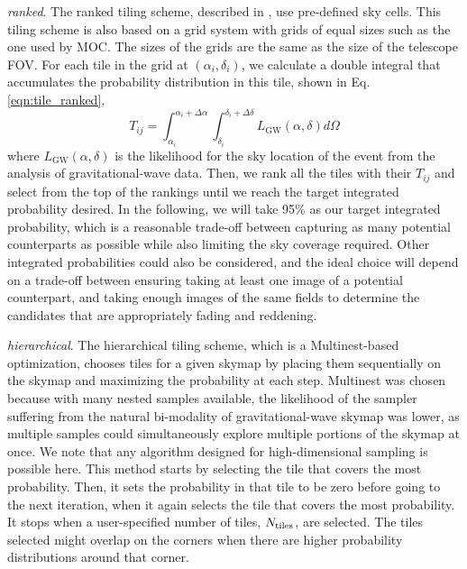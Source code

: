 \documentclass[twocolumn]{aastex62}
\begin{document}
\emph{ranked}. The ranked tiling scheme, described in \cite{GhBl2016}, use pre-defined sky cells. This tiling scheme is also based on a grid system with grids of equal sizes such as the one used by MOC. The sizes of the grids are the same as the size of the telescope FOV. For each tile in the grid at $(\alpha_i, \delta_i)$, we calculate a double integral that accumulates the probability distribution in this tile, shown in Eq.\ref{eqn:tile_ranked},
\begin{equation}\label{eqn:tile_ranked}
T_{ij} = \int_{\alpha_i}^{\alpha_i+\Delta \alpha}\int_{\delta_i}^{\delta_i+\Delta \delta}L_\textrm{GW}(\alpha,\delta)d\Omega
\end{equation}
where $L_\textrm{GW}(\alpha,\delta)$ is the likelihood for the sky location of the event from the analysis of gravitational-wave data.
Then, we rank all the tiles with their $T_{ij}$ and select from the top of the rankings until we reach the target integrated probability desired.
In the following, we will take 95\% as our target integrated probability, which is a reasonable trade-off between capturing as many potential counterparts as possible while also limiting the sky coverage required. Other integrated probabilities could also be considered, and the ideal choice will depend on a trade-off between ensuring taking at least one image of a potential counterpart, and taking enough images of the same fields to determine the candidates that are appropriately fading and reddening.

\emph{hierarchical}. The hierarchical tiling scheme, which is a Multinest-based \citep{FeHo2009,FeGa2009,BuGe2014} optimization, chooses tiles for a given skymap by placing them sequentially on the skymap and maximizing the probability at each step. Multinest was chosen because with many nested samples available, the likelihood of the sampler suffering from the natural bi-modality of gravitational-wave skymap was lower, as multiple samples could simultaneously explore multiple portions of the skymap at once. We note that any algorithm designed for high-dimensional sampling is possible here. This method starts by selecting the tile that covers the most probability. Then, it sets the probability in that tile to be zero before going to the next iteration, when it again selects the tile that covers the most probability. It stops when a user-specified number of tiles, $N_{\rm tiles}$, are selected. The tiles selected might overlap on the corners when there are higher probability distributions around that corner. 
 
\end{document}

